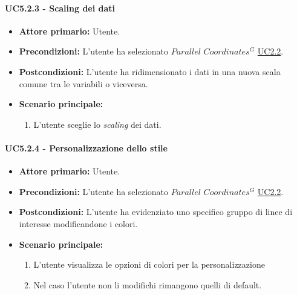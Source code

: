 \paragraph{UC5.2.3 - Scaling dei dati}
\label{sec:UC5.2.3}
    \begin{itemize}
        \item \textbf{Attore primario:} Utente.
        \item \textbf{Precondizioni:} L'utente ha selezionato $Parallel$ $Coordinates^{G}$ \hyperref[sec:UC2.2]{UC2.2}.
	    \item \textbf{Postcondizioni:} L'utente ha ridimensionato i dati in una nuova scala comune tra le variabili o viceversa.
	    \item \textbf{Scenario principale:} 
	    \begin{enumerate}
	    		\item L'utente sceglie lo \textit{scaling} dei dati.
		\end{enumerate}
    \end{itemize}

\paragraph{UC5.2.4 - Personalizzazione dello stile}
\label{sec:UC5.2.4}
    \begin{itemize}
        \item \textbf{Attore primario:} Utente.
        \item \textbf{Precondizioni:} L'utente ha selezionato $Parallel$ $Coordinates^{G}$ \hyperref[sec:UC2.2]{UC2.2}.
	    \item \textbf{Postcondizioni:} L'utente ha evidenziato uno specifico gruppo di linee di interesse modificandone i colori.
	    \item \textbf{Scenario principale:} 
	    \begin{enumerate}
	    		\item L'utente visualizza le opzioni di colori per la personalizzazione
	    		\item Nel caso l'utente non li modifichi rimangono quelli di default.
		\end{enumerate}
    \end{itemize}


